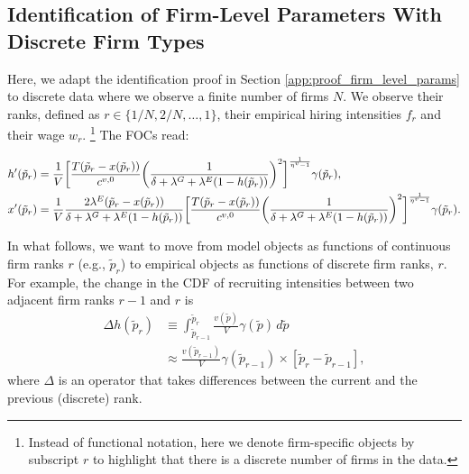 \subsection{Identification of Firm-Level Parameters With Discrete Firm Types\label{app:identification_discrete}}

Here, we adapt the identification proof in Section \ref{app:proof_firm_level_params} to discrete data where we observe a finite number of firms $N$. We observe their ranks, defined as $r \in \{ 1/N, 2/N, \ldots, 1 \}$, their empirical hiring intensities $f_{r}$ and their wage $w_{r}$.%
%
\footnote{Instead of functional notation, here we denote firm-specific objects by subscript $r$ to highlight that there is a discrete number of firms in the data.} %
%
The FOCs read:
%
\begin{small}
    \begin{align}
        h'(\tilde{p}_{r}) &= \frac{1}{V} \biggl{[} \frac{T (\tilde{p}_{r} - x(\tilde{p}_{r}))}{c^{v,0}} \biggl{(} \frac{1}{\delta + \lambda^{G} + \lambda^{E} (1 - h(\tilde{p}_{r}))} \biggr{)}^2 \biggr{]}^{\frac{1}{\eta^{v} - 1}} \gamma(\tilde{p}_{r}), \label{eq:hprime} \\
        x'(\tilde{p}_{r}) &=  \frac{1}{V} \frac{2 \lambda^{E} (\tilde{p}_{r} - x(\tilde{p}_{r}))}{\delta + \lambda^{G} + \lambda^{E} (1 - h(\tilde{p}_{r}))}  \biggr{[} \frac{T (\tilde{p}_{r} - x(\tilde{p}_{r}))}{c^{v,0}} \biggl{(} \frac{1}{\delta + \lambda^{G} + \lambda^{E} (1 - h(\tilde{p}_{r}))} \biggr{)}^2 \biggr{]}^{\frac{1}{\eta^{v}-1}} \gamma(\tilde{p}_{r}). \label{eq:xprime}
    \end{align}
\end{small}
%
In what follows, we want to move from model objects as functions of continuous firm ranks $r$ (e.g., $\tilde{p}_{r}$) to empirical objects as functions of discrete firm ranks, $r$. For example, the change in the CDF of recruiting intensities between two adjacent firm ranks $r - 1$ and $r$ is
%
\begin{align}
    \Delta h(\tilde{p}_{r}) %
    &\equiv \int_{\tilde{p}_{r - 1}}^{\tilde{p}_{r}} \frac{v(\tilde{p})}{V} \gamma(\tilde{p}) \, d \tilde{p} \label{eq:offer_dist_step_1} \\
    &\approx \frac{v(\tilde{p}_{r - 1})}{V} \gamma(\tilde{p}_{r - 1}) \times [\tilde{p}_{r} - \tilde{p}_{r - 1}], \label{eq:offer_dist_step_2}
\end{align}
%
where $\Delta$ is an operator that takes differences between the current and the previous (discrete) rank. %
